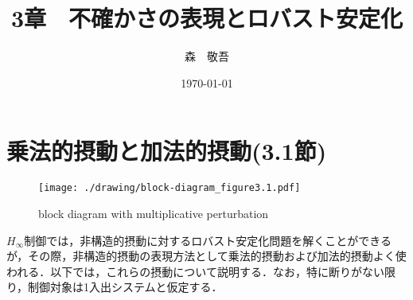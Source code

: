 \documentclass[a4paper,11pt,uplatex]{jsarticle} %
\author{森　敬吾}
\date{\today}
\title{3章　不確かさの表現とロバスト安定化}
\theoremstyle{definition}	%
\begin{document}
\maketitle %
\tableofcontents %
\pagestyle{fancy}
\lhead{\today}
\section{乗法的摂動と加法的摂動(3.1節)}

\begin{figure}[t]
\centering
\texttt{[image: ./drawing/block-diagram\_figure3.1.pdf]}
\caption{block diagram with multiplicative perturbation}
\label{fig:block diagram of fig 3.1}
\end{figure}

$H_\infty$制御では，非構造的摂動に対するロバスト安定化問題を解くことができるが，その際，非構造的摂動の表現方法として乗法的摂動および加法的摂動よく使われる．以下では，これらの摂動について説明する．なお，特に断りがない限り，制御対象は1入出システムと仮定する．
\end{document}
